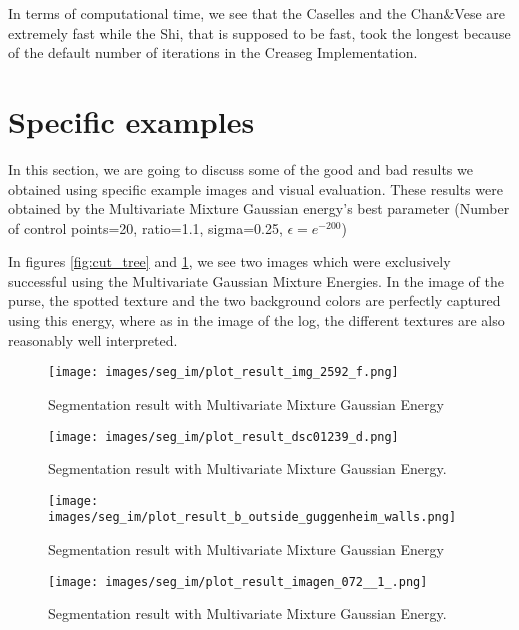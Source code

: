 In terms of computational time, we see that the Caselles and the Chan\&Vese are extremely fast while the Shi, that is supposed to be fast, took the longest because of the default number of iterations in the Creaseg Implementation. 

\section{Specific examples}
\noindent

In this section, we are going to discuss some of the good and bad results we obtained using specific example images and visual evaluation. These results were obtained by the Multivariate Mixture Gaussian energy's best parameter (Number of control points=20, ratio=1.1, sigma=0.25, $\epsilon = e^{-200}$)

In figures \ref{fig:cut_tree} and \ref{fig:purse}, we see two images which were exclusively successful using the Multivariate Gaussian Mixture Energies. In the image of the purse, the spotted texture and the two background colors are perfectly captured using this energy, where as in the image of the log, the different textures are also reasonably well interpreted.

\begin{figure}[h!]
	\centering
	\begin{minipage}{0.45\textwidth}
		\centering
		{\texttt{[image: images/seg\_im/plot\_result\_img\_2592\_f.png]}} %
		\caption{Segmentation result with Multivariate Mixture Gaussian Energy} \label{fig:cut_tree}
	\end{minipage}\hfill
	\begin{minipage}{0.5\textwidth}
		\centering
		{\texttt{[image: images/seg\_im/plot\_result\_dsc01239\_d.png]}}
		\caption{Segmentation result with Multivariate Mixture Gaussian Energy.}\label{fig:purse}
	\end{minipage}
	\centering
\end{figure}

\begin{figure}[h!]
	\centering
	\begin{minipage}{0.45\textwidth}
		\centering
		{\texttt{[image: images/seg\_im/plot\_result\_b\_outside\_guggenheim\_walls.png]}} %
		\caption{Segmentation result with Multivariate Mixture Gaussian Energy} \label{fig:guggenheim}
	\end{minipage}\hfill
	\begin{minipage}{0.5\textwidth}
		\centering
		{\texttt{[image: images/seg\_im/plot\_result\_imagen\_072\_\_1\_.png]}}
		\caption{Segmentation result with Multivariate Mixture Gaussian Energy.}\label{fig:akbar}
	\end{minipage}
	\centering
\end{figure}

